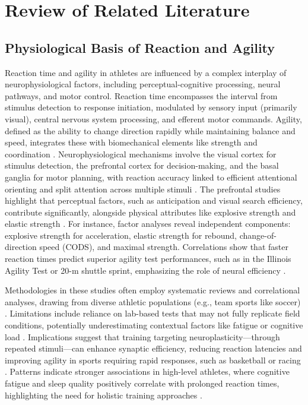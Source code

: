 \chapter{Review of Related Literature}
\label{sec:relatedlit}

\section{Physiological Basis of Reaction and Agility}

	Reaction time and agility in athletes are influenced by a complex interplay of neurophysiological factors, including perceptual-cognitive processing, neural pathways, and motor control. Reaction time encompasses the interval from stimulus detection to response initiation, modulated by sensory input (primarily visual), central nervous system processing, and efferent motor commands. Agility, defined as the ability to change direction rapidly while maintaining balance and speed, integrates these with biomechanical elements like strength and coordination \parencite{Pojskic:2019:RVU}. Neurophysiological mechanisms involve the visual cortex for stimulus detection, the prefrontal cortex for decision-making, and the basal ganglia for motor planning, with reaction accuracy linked to efficient attentional orienting and split attention across multiple stimuli \parencite{Chow:2022:RTP}. The prefrontal studies highlight that perceptual factors, such as anticipation and visual search efficiency, contribute significantly, alongside physical attributes like explosive strength and elastic strength \parencite{Yildiz:2020:RRA}. For instance, factor analyses reveal independent components: explosive strength for acceleration, elastic strength for rebound, change-of-direction speed (CODS), and maximal strength. Correlations show that faster reaction times predict superior agility test performances, such as in the Illinois Agility Test or 20-m shuttle sprint, emphasizing the role of neural efficiency \parencite{Wang:2024:TME}.
	
	Methodologies in these studies often employ systematic reviews and correlational analyses, drawing from diverse athletic populations (e.g., team sports like soccer) \parencite{Turna:2020:EAT}. Limitations include reliance on lab-based tests that may not fully replicate field conditions, potentially underestimating contextual factors like fatigue or cognitive load \parencite{Pojskic:2019:RVU}. Implications suggest that training targeting neuroplasticity—through repeated stimuli—can enhance synaptic efficiency, reducing reaction latencies and improving agility in sports requiring rapid responses, such as basketball or racing \parencite{Chow:2022:RTP}. Patterns indicate stronger associations in high-level athletes, where cognitive fatigue and sleep quality positively correlate with prolonged reaction times, highlighting the need for holistic training approaches \parencite{Yildiz:2020:RRA}.


